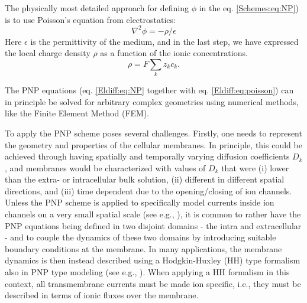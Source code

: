 \subsubsection{}
\label{sec:Schemes:PNP}
The physically most detailed approach for defining $\phi$ in the eq. \ref{Schemes:eq:NP}) is to use Poisson's equation from electrostatics:
\begin{equation}
\nabla^2 \phi = -\rho/\epsilon
\label{Schemes:eq:poisson}
\end{equation}
Here $\epsilon$ is the permittivity of the medium, and in the last step, we have expressed the local charge density $\rho$ as a function of the ionic concentrations. 
\begin{equation}
\rho = F\sum_k z_k c_k.
\label{Schemes:eq:PNPrho}
\end{equation}

The PNP equations (eq. \ref{Eldiff:eq:NP} together with eq. \ref{Eldiff:eq:poisson}) can in principle be solved for arbitrary complex geometries using numerical methods, like the Finite Element Method (FEM). 

To apply the PNP scheme poses several challenges. Firstly, one needs to represent the geometry and properties of the cellular membranes. In principle, this could be achieved through having spatially and temporally varying diffusion coefficients $D_k$, and membranes would be characterized with values of $D_k$ that were (i) lower than the extra- or intracellular bulk solution, (ii) different in different spatial directions, and (iii) time dependent due to the opening/closing of ion channels. Unless the PNP scheme is applied to specifically model currents inside ion channels on a very small spatial scale (see e.g., \cite{Gardner2011, Zheng2011}), it is common to rather have the PNP equations being defined in two disjoint domains - the intra and extracellular - and to couple the dynamics of these two domains by introducing suitable boundary conditions at the membrane. In many applications, the membrane dynamics is then instead described using a Hodgkin-Huxley (HH) type formalism also in PNP type modeling (see e.g., \cite{Lopreore2008, Pods2013, Gardner2015, Pods2017}). When applying a HH formalism in this context, all transmembrane currents must be made ion specific, i.e., they must be described in terms of ionic fluxes over the membrane. 

